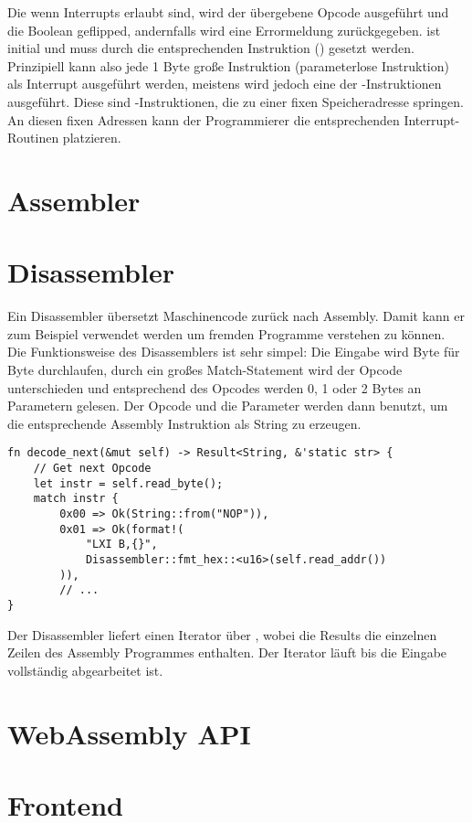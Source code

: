 Die wenn Interrupts erlaubt sind, wird der übergebene Opcode ausgeführt und die Boolean geflipped, andernfalls wird eine Errormeldung zurückgegeben.  ist initial  und muss durch die entsprechenden Instruktion () gesetzt werden.
Prinzipiell kann also jede 1 Byte große Instruktion (parameterlose Instruktion) als Interrupt ausgeführt werden, meistens wird jedoch eine der -Instruktionen ausgeführt. Diese sind -Instruktionen, die zu einer fixen Speicheradresse springen. An diesen fixen Adressen kann der Programmierer die entsprechenden Interrupt-Routinen platzieren.

\section{Assembler}

\section{Disassembler}

Ein Disassembler übersetzt Maschinencode zurück nach Assembly. Damit kann er zum Beispiel verwendet werden um fremden Programme verstehen zu können.
Die Funktionsweise des Disassemblers ist sehr simpel: Die Eingabe wird Byte für Byte durchlaufen, durch ein großes Match-Statement wird der Opcode unterschieden und entsprechend des Opcodes werden 0, 1 oder 2 Bytes an Parametern gelesen. Der Opcode und die Parameter werden dann benutzt, um die entsprechende Assembly Instruktion als String zu erzeugen.

\begin{verbatim}
fn decode_next(&mut self) -> Result<String, &'static str> {
    // Get next Opcode
    let instr = self.read_byte();
    match instr {
        0x00 => Ok(String::from("NOP")),
        0x01 => Ok(format!(
            "LXI B,{}",
            Disassembler::fmt_hex::<u16>(self.read_addr())
        )),
        // ...
}
\end{verbatim}

Der Disassembler liefert einen Iterator über , wobei die Results die einzelnen Zeilen des Assembly Programmes enthalten. Der Iterator läuft bis die Eingabe vollständig abgearbeitet ist.

\section{WebAssembly API}

\section{Frontend}
